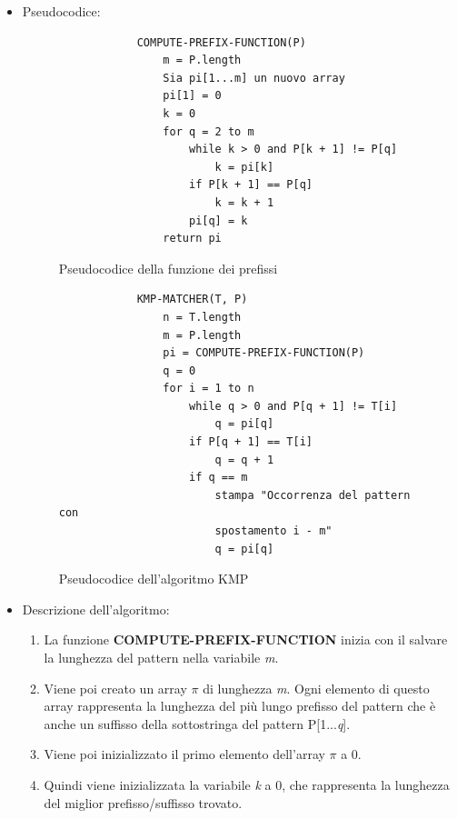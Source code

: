 \documentclass{article}
\begin{document}
\begin{itemize}
    \item Pseudocodice:
          \begin{figure}[H]
              \begin{lstlisting}
            COMPUTE-PREFIX-FUNCTION(P)
                m = P.length
                Sia pi[1...m] un nuovo array
                pi[1] = 0
                k = 0
                for q = 2 to m
                    while k > 0 and P[k + 1] != P[q]
                        k = pi[k]
                    if P[k + 1] == P[q]
                        k = k + 1
                    pi[q] = k
                return pi
            \end{lstlisting}
              \caption{Pseudocodice della funzione dei prefissi}
              \label{fig:prefix-function-pseudocode}
          \end{figure}
          \begin{figure}[H]
              \centering
              \begin{lstlisting}
            KMP-MATCHER(T, P)
                n = T.length
                m = P.length
                pi = COMPUTE-PREFIX-FUNCTION(P)
                q = 0
                for i = 1 to n
                    while q > 0 and P[q + 1] != T[i]
                        q = pi[q]
                    if P[q + 1] == T[i]
                        q = q + 1
                    if q == m
                        stampa "Occorrenza del pattern con
                        spostamento i - m"
                        q = pi[q]
            \end{lstlisting}
              \caption{Pseudocodice dell'algoritmo KMP}
              \label{fig:KMP-pseudocode}
          \end{figure}
    \item Descrizione dell'algoritmo:
          \begin{enumerate}[label=\arabic*a.]
              \item La funzione \textbf{COMPUTE-PREFIX-FUNCTION} inizia con il salvare la lunghezza del pattern nella variabile \textit{m}.
              \item Viene poi creato un array $\pi$ di lunghezza \textit{m}. Ogni elemento di questo array rappresenta la lunghezza del più lungo prefisso del pattern che è anche un suffisso della sottostringa del pattern P[1...\textit{q}].
              \item Viene poi inizializzato il primo elemento dell'array $\pi$ a 0.
              \item Quindi viene inizializzata la variabile \textit{k} a 0, che rappresenta la lunghezza del miglior prefisso/suffisso trovato.

\end{enumerate}
\end{itemize}
\end{document}
